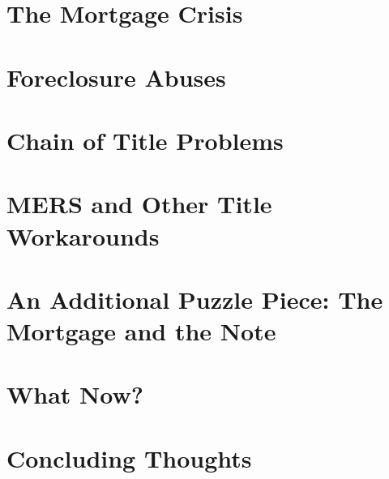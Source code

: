 \section{The Mortgage Crisis}




\section{Foreclosure Abuses}






\begin{questions}

\end{questions}

\section{Chain of Title Problems}





\begin{questions}

\end{questions}





\section{MERS and Other Title Workarounds}




\begin{questions}

\end{questions}



\section{An Additional Puzzle Piece: The Mortgage and the Note}




\section{What Now?}




\section{Concluding Thoughts}



\endinput
